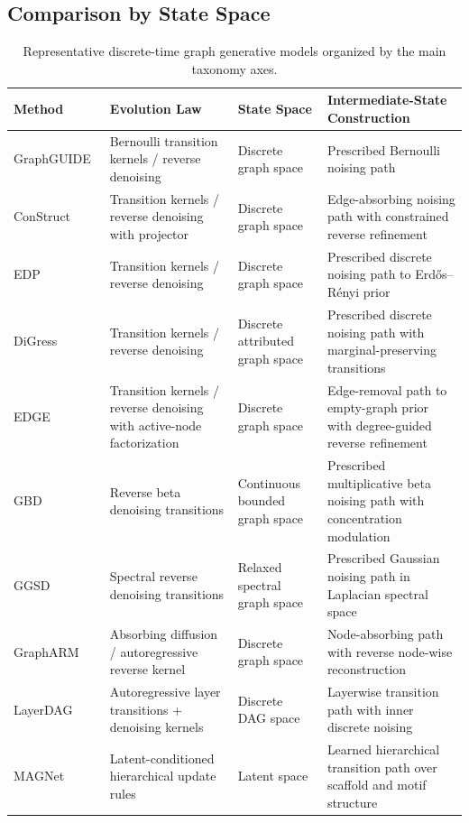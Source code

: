 \documentclass{article}
\begin{document}
\subsection{Comparison by State Space}
\label{sec:compare_state_space}



\begin{table}[!t]
\centering
\caption{Representative discrete-time graph generative models organized by the main taxonomy axes.}
\label{tab:taxonomy_models_discrete}
\small
\renewcommand{\arraystretch}{1.15}
\setlength{\tabcolsep}{4pt}
\begin{tabularx}{\textwidth}{|
    >{\raggedright\arraybackslash}p{2.8cm}|
    >{\raggedright\arraybackslash}p{2.9cm}|
    >{\raggedright\arraybackslash}p{2.5cm}|
    >{\raggedright\arraybackslash}X|}
\hline
\textbf{Method} & \textbf{Evolution Law} & \textbf{State Space} & \textbf{Intermediate-State Construction} \\
\hline
GraphGUIDE~\cite{tseng2023graphguide} & Bernoulli transition kernels / reverse denoising & Discrete graph space & Prescribed Bernoulli noising path \\
\hline
ConStruct~\cite{madeira2024generative} & Transition kernels / reverse denoising with projector & Discrete graph space & Edge-absorbing noising path with constrained reverse refinement \\
\hline
EDP~\cite{haefeli2022diffusion} & Transition kernels / reverse denoising & Discrete graph space & Prescribed discrete noising path to Erd\H{o}s--R\'enyi prior \\
\hline
DiGress~\cite{vignac2022digress} & Transition kernels / reverse denoising & Discrete attributed graph space & Prescribed discrete noising path with marginal-preserving transitions \\
\hline
EDGE~\cite{chen2023efficient} & Transition kernels / reverse denoising with active-node factorization & Discrete graph space & Edge-removal path to empty-graph prior with degree-guided reverse refinement \\
\hline
GBD~\cite{liu2024advancing} & Reverse beta denoising transitions & Continuous bounded graph space & Prescribed multiplicative beta noising path with concentration modulation \\
\hline
GGSD~\cite{minello2024generating} & Spectral reverse denoising transitions & Relaxed spectral graph space & Prescribed Gaussian noising path in Laplacian spectral space \\
\hline
GraphARM~\cite{kongautoregressive} & Absorbing diffusion / autoregressive reverse kernel & Discrete graph space & Node-absorbing path with reverse node-wise reconstruction \\
\hline
LayerDAG~\cite{li2024layerdag} & Autoregressive layer transitions + denoising kernels & Discrete DAG space & Layerwise transition path with inner discrete noising \\
\hline
MAGNet~\cite{hetzel2025magnet} & Latent-conditioned hierarchical update rules & Latent space & Learned hierarchical transition path over scaffold and motif structure \\
\hline
\end{tabularx}
\end{table}
\end{document}
